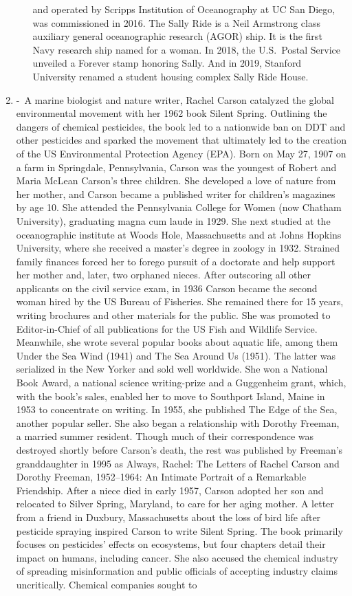 \documentclass[12pt,a4paper]{article}
\begin{document}
\begin{enumerate}
\begin{itemize}
and operated by Scripps Institution of Oceanography at UC San Diego, was commissioned in 2016. The Sally Ride is a Neil Armstrong class auxiliary general oceanographic research (AGOR) ship. It is the first Navy research ship named for a woman. In 2018, the U.S.\ Postal Service unveiled a Forever stamp honoring Sally. And in 2019, Stanford University renamed a student housing complex Sally Ride House.
    \end{itemize}
    \item {} -\ A marine biologist and nature writer, Rachel Carson catalyzed the global environmental movement with her 1962 book Silent Spring. Outlining the dangers of chemical pesticides, the book led to a nationwide ban on DDT and other pesticides and sparked the movement that ultimately led to the creation of the US Environmental Protection Agency (EPA). Born on May 27, 1907 on a farm in Springdale, Pennsylvania, Carson was the youngest of Robert and Maria McLean Carson’s three children. She developed a love of nature from her mother, and Carson became a published writer for children’s magazines by age 10. She attended the Pennsylvania College for Women (now Chatham University), graduating magna cum laude in 1929. She next studied at the oceanographic institute at Woods Hole, Massachusetts and at Johns Hopkins University, where she received a master’s degree in zoology in 1932. Strained family finances forced her to forego pursuit of a doctorate and help support her mother and, later, two orphaned nieces. After outscoring all other applicants on the civil service exam, in 1936 Carson became the second woman hired by the US Bureau of Fisheries. She remained there for 15 years, writing brochures and other materials for the public. She was promoted to Editor-in-Chief of all publications for the US Fish and Wildlife Service. Meanwhile, she wrote several popular books about aquatic life, among them Under the Sea Wind (1941) and The Sea Around Us (1951). The latter was serialized in the New Yorker and sold well worldwide. She won a National Book Award, a national science writing-prize and a Guggenheim grant, which, with the book’s sales, enabled her to move to Southport Island, Maine in 1953 to concentrate on writing. In 1955, she published The Edge of the Sea, another popular seller. She also began a relationship with Dorothy Freeman, a married summer resident. Though much of their correspondence was destroyed shortly before Carson’s death, the rest was published by Freeman’s granddaughter in 1995 as Always, Rachel: The Letters of Rachel Carson and Dorothy Freeman, 1952–1964: An Intimate Portrait of a Remarkable Friendship. After a niece died in early 1957, Carson adopted her son and relocated to Silver Spring, Maryland, to care for her aging mother. A letter from a friend in Duxbury, Massachusetts about the loss of bird life after pesticide spraying inspired Carson to write Silent Spring. The book primarily focuses on pesticides' effects on ecosystems, but four chapters detail their impact on humans, including cancer. She also accused the chemical industry of spreading misinformation and public officials of accepting industry claims uncritically. Chemical companies sought to 
\end{enumerate}
\end{document}
